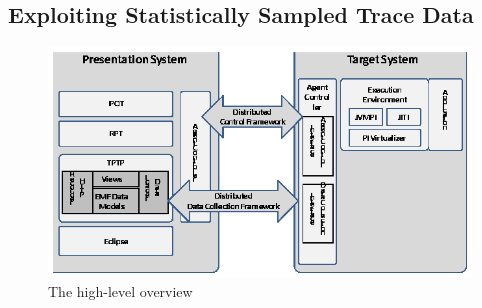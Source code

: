 \subsection{Exploiting Statistically Sampled Trace Data}
\label{sec:statistical}

\begin{figure}[t]
\centering
\includegraphics[scale=0.95,clip]{figs/approach.eps}
\caption{The high-level overview} \label{fig:omr}
\end{figure}

